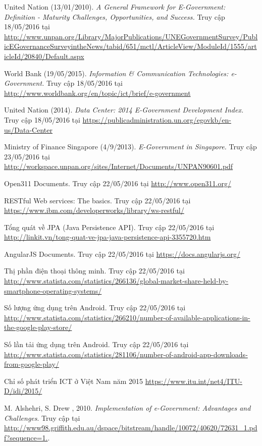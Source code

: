 \documentclass[a4paper]{article}
\begin{document}
\begin{thebibliography}{99}
United Nation (13/01/2010). \textit{A General Framework for E-Government: Definition - Maturity Challenges, Opportunities, and Success.} Truy cập 18/05/2016 tại \url{http://www.unpan.org/Library/MajorPublications/UNEGovernmentSurvey/PublicEGovernanceSurveyintheNews/tabid/651/mctl/ArticleView/ModuleId/1555/articleId/20840/Default.aspx}

World Bank (19/05/2015). \textit{Information \& Communication Technologies: e-Government.} Truy cập 18/05/2016 tại \url{http://www.worldbank.org/en/topic/ict/brief/e-government}

United Nation (2014). \textit{Data Center: 2014 E-Government Development Index.} Truy cập 18/05/2016 tại \url{https://publicadministration.un.org/egovkb/en-us/Data-Center}

Ministry of Finance Singapore (4/9/2013). \textit{E-Government in Singapore.} Truy cập 23/05/2016 tại \url{http://workspace.unpan.org/sites/Internet/Documents/UNPAN90601.pdf}

Open311 Documents. Truy cập 22/05/2016 tại
 \url{http://www.open311.org/} 
 
RESTful Web services: The basics. Truy cập 22/05/2016 tại
 \url{https://www.ibm.com/developerworks/library/ws-restful/} 
 
Tổng quát về JPA (Java Persistence API). Truy cập 22/05/2016 tại
 \url{http://linkit.vn/tong-quat-ve-jpa-java-persistence-api-3355720.htm} 
 
AngularJS Documents. Truy cập 22/05/2016 tại
 \url{https://docs.angularjs.org/} 
 
Thị phần điện thoại thông minh. Truy cập 22/05/2016 tại
 \url{http://www.statista.com/statistics/266136/global-market-share-held-by-smartphone-operating-systems/} 

Số lượng ứng dụng trên Android. Truy cập 22/05/2016 tại
 \url{http://www.statista.com/statistics/266210/number-of-available-applications-in-the-google-play-store/}
 
Số lần tải ứng dụng trên Android. Truy cập 22/05/2016 tại
 \url{http://www.statista.com/statistics/281106/number-of-android-app-downloads-from-google-play/}

Chỉ số phát triển ICT ở Việt Nam năm 2015
 \url{https://www.itu.int/net4/ITU-D/idi/2015/}
 
M. Alshehri, S. Drew , 2010. \textit{Implementation of e-Government:
Advantages and Challenges}. Truy cập tại \url{http://www98.griffith.edu.au/dspace/bitstream/handle/10072/40620/72631_1.pdf?sequence=1.}.


\end{thebibliography}
\end{document}

